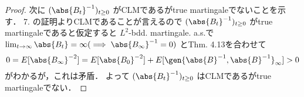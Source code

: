 \documentclass{jsarticle}
\begin{document}
\begin{enumerate}
\begin{proof}
        次に $(\abs{B_t}^{-1})_{t\ge0}$ がCLMであるがtrue martingaleでないことを示す．
        7. の証明よりCLMであることが言えるので $(\abs{B_t}^{-1})_{t\ge0}$ がtrue martingaleであると仮定すると $L^2$-bdd. martingale.
        a.s.で $\lim_{t\to\infty}\abs{B_t}=\infty(\implies \abs{B_\infty}^{-1}=0)$ とThm. 4.13を合わせて
        $$
        0
        = E[\abs{B_\infty}^{-2}]
        = E[\abs{B_0}^{-2}]
        + E[\gen{\abs{B}^{-1}, \abs{B}^{-1}}_\infty]
        > 0
        $$
        がわかるが，これは矛盾．
        よって $(\abs{B_t}^{-1})_{t\ge0}$ はCLMであるがtrue martingaleでない．
    \end{proof}
\end{enumerate}
\end{document}
